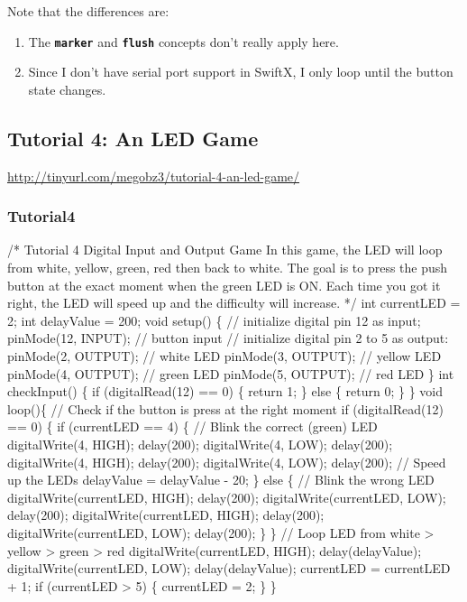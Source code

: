 \documentclass[10pt,english]{article}
\begin{document}
Note that the differences are:
\begin{enumerate}
\item The \texttt{\textbf{marker}} and \texttt{\textbf{flush}} concepts
don't really apply here.
\item Since I don't have serial port support in SwiftX, I only loop until
the button state changes.
\end{enumerate}

\subsection{Tutorial 4: An LED Game}

\url{http://tinyurl.com/megobz3/tutorial-4-an-led-game/}


\subsubsection{Tutorial4}

\nwenddocs{}\endmoddef
/*
  Tutorial 4 Digital Input and Output Game
  In this game, the LED will loop from white, yellow, green, red
  then back to white.  The goal is to press the push button at the exact
  moment when the green LED is ON. Each time you got it right, the LED
  will speed up and the difficulty will increase.
*/
int currentLED = 2;
int delayValue = 200;
void setup() \{
  // initialize digital pin 12 as input;
  pinMode(12, INPUT);   // button input
  // initialize digital pin 2 to 5 as output:
  pinMode(2, OUTPUT);   // white LED
  pinMode(3, OUTPUT);   // yellow LED
  pinMode(4, OUTPUT);   // green LED
  pinMode(5, OUTPUT);   // red LED
\}
int checkInput() \{ 
  if (digitalRead(12) == 0) \{
    return 1;
  \} else \{
    return 0;
  \}
\}
void loop()\{
  // Check if the button is press at the right moment
  if (digitalRead(12) == 0) \{
    if (currentLED == 4) \{
       // Blink the correct (green) LED
       digitalWrite(4, HIGH);
       delay(200);
       digitalWrite(4, LOW);
       delay(200);
       digitalWrite(4, HIGH);
       delay(200);
       digitalWrite(4, LOW);
       delay(200);
       // Speed up the LEDs
       delayValue = delayValue - 20; 
    \} else \{
       // Blink the wrong LED
       digitalWrite(currentLED, HIGH);
       delay(200);
       digitalWrite(currentLED, LOW);
       delay(200);
       digitalWrite(currentLED, HIGH);
       delay(200);
       digitalWrite(currentLED, LOW);
       delay(200);
    \}
  \}
  // Loop LED from white > yellow > green > red
  digitalWrite(currentLED, HIGH);
  delay(delayValue);
  digitalWrite(currentLED, LOW);
  delay(delayValue);
  currentLED = currentLED + 1;
  if (currentLED > 5) \{
     currentLED = 2;
  \}
\}
\nwendcode{}\nwdocspar
\end{document}
